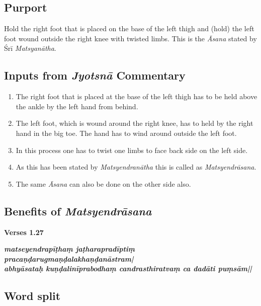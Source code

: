 \subsection*{Purport}
\vspace{-5pt}

Hold the right foot that is placed on the base of the left thigh and (hold) the left foot wound outside the right knee with twisted limbs. This is the \textit{Āsana} stated by Śrī \textit{Matsyanātha}.
\vspace{-10pt}

\subsection*{Inputs from \textit{Jyotsnā} Commentary}
\vspace{-10pt}

\begin{enumerate}
\itemsep=0pt
\item The right foot that is placed at the base of the left thigh has to be held above the ankle by the left hand from behind. 
\item The left foot, which is wound around the right knee, has to held by the right hand in the big toe. The hand has to wind around outside the left foot. 
\item In this process one has to twist one limbs to face back side on the left side.
\item As this has been stated by \textit{Matsyendranātha} this is called as \textit{Matsyendrāsana}. 
\item The same \textit{Āsana} can also be done on the other side also.  
\end{enumerate}

\subsection*{Benefits of \textit{Matsyendrāsana}}

\noindent 
\textbf{Verses 1.27}

\begin{shloka}
\textit{\textbf{matseyendrapīṭhaṃ jaṭharapradīptiṃ pracaṇḍarugmaṇḍalakhaṇḍanāstram|}\\
\textbf{abhyāsataḥ kuṇḍalinīprabodhaṃ candrasthiratvaṃ ca dadāti puṃsām||}}
\end{shloka}

\subsection*{Word split}

